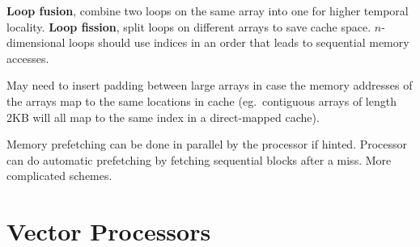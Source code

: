 \documentclass[a4paper, 11pt]{article}
\begin{document}
{{        \textbf{Loop fusion}, combine two loops on the same array into one for higher temporal locality. \textbf{Loop fission}, split loops on different arrays to save cache space. \(n\)-dimensional loops should use indices in an order that leads to sequential memory accesses.

        May need to insert padding between large arrays in case the memory addresses of the arrays map to the same locations in cache (eg.\ contiguous arrays of length 2KB will all map to the same index in a direct-mapped cache).

        Memory prefetching can be done in parallel by the processor if hinted. Processor can do automatic prefetching by fetching sequential blocks after a miss. More complicated schemes.
    }
}
\section*{Vector Processors}
\end{document}
